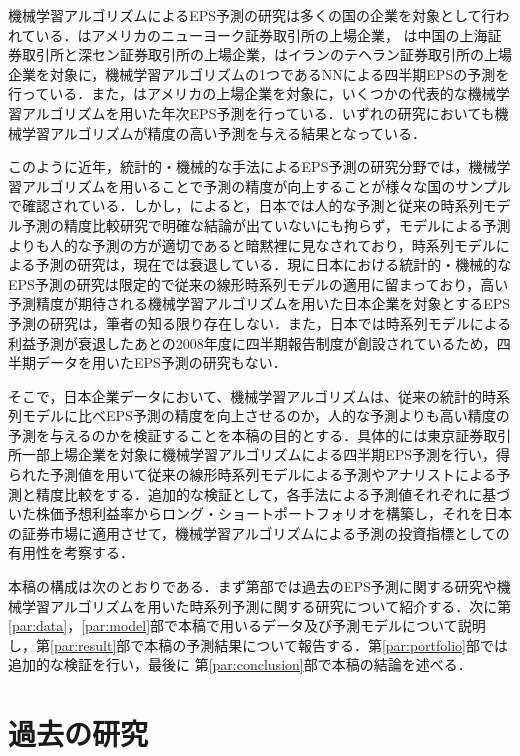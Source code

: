 \documentclass[a4paper，12pt]{jsarticle}
\begin{document}
機械学習アルゴリズムによるEPS予測の研究は多くの国の企業を対象として行われている．\cite{zhang2004neural}はアメリカのニューヨーク証券取引所の上場企業，\cite*{cao2009forecasting} は中国の上海証券取引所と深セン証券取引所の上場企業，\cite{etemadi2015earnings}はイランのテヘラン証券取引所の上場企業を対象に，機械学習アルゴリズムの1つであるNNによる四半期EPSの予測を行っている．また，\cite*{cao2020fundamental}はアメリカの上場企業を対象に，いくつかの代表的な機械学習アルゴリズムを用いた年次EPS予測を行っている．いずれの研究においても機械学習アルゴリズムが精度の高い予測を与える結果となっている．

このように近年，統計的・機械的な手法によるEPS予測の研究分野では，機械学習アルゴリズムを用いることで予測の精度が向上することが様々な国のサンプルで確認されている．しかし，\cite{ota2006}によると，日本では人的な予測と従来の時系列モデル予測の精度比較研究で明確な結論が出ていないにも拘らず，モデルによる予測よりも人的な予測の方が適切であると暗黙裡に見なされており，時系列モデルによる予測の研究は，現在では衰退している．現に日本における統計的・機械的なEPS予測の研究は限定的で従来の線形時系列モデルの適用に留まっており，高い予測精度が期待される機械学習アルゴリズムを用いた日本企業を対象とするEPS予測の研究は，筆者の知る限り存在しない．また，日本では時系列モデルによる利益予測が衰退したあとの2008年度に四半期報告制度が創設されているため，四半期データを用いたEPS予測の研究もない．

そこで，日本企業データにおいて、機械学習アルゴリズムは、従来の統計的時系列モデルに比べEPS予測の精度を向上させるのか，人的な予測よりも高い精度の予測を与えるのかを検証することを本稿の目的とする．具体的には東京証券取引所一部上場企業を対象に機械学習アルゴリズムによる四半期EPS予測を行い，得られた予測値を用いて従来の線形時系列モデルによる予測やアナリストによる予測と精度比較をする．追加的な検証として，各手法による予測値それぞれに基づいた株価予想利益率からロング・ショートポートフォリオを構築し，それを日本の証券市場に適用させて，機械学習アルゴリズムによる予測の投資指標としての有用性を考察する．

本稿の構成は次のとおりである．まず第\ref{par:litrev}部では過去のEPS予測に関する研究や機械学習アルゴリズムを用いた時系列予測に関する研究について紹介する．次に第\ref{par:data}，\ref{par:model}部で本稿で用いるデータ及び予測モデルについて説明し，第\ref{par:result}部で本稿の予測結果について報告する．第\ref{par:portfolio}部では追加的な検証を行い，最後に 第\ref{par:conclusion}部で本稿の結論を述べる．

\part{過去の研究} \label{par:litrev}
\end{document}
